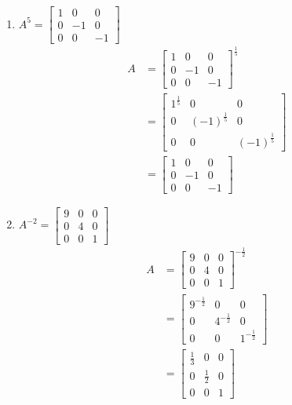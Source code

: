 \documentclass[
  letterpaper,
  DIV=11,
  numbers=noendperiod]{scrartcl}
\providecommand{\tightlist}{%
  \setlength{\itemsep}{0pt}\setlength{\parskip}{0pt}}\usepackage{longtable,booktabs,array}
\begin{document}
\begin{enumerate}
\def\labelenumi{\arabic{enumi})}
\tightlist
\item
  \(A^5=\begin{bmatrix}1 & 0 & 0 \\ 0 & -1 & 0 \\ 0 & 0 & -1\end{bmatrix}\)
  \begin{align*}
  A &= \begin{bmatrix}1 & 0 & 0 \\ 0 & -1 & 0 \\ 0 & 0 & -1\end{bmatrix}^{\frac{1}{5}} \\
  &= \begin{bmatrix}1^{\frac{1}{5}} & 0 & 0 \\ 0 & (-1)^{\frac{1}{5}} & 0 \\ 0 & 0 & (-1)^{\frac{1}{5}}\end{bmatrix} \\
  &= \begin{bmatrix}1 & 0 & 0 \\ 0 & -1 & 0 \\ 0 & 0 & -1\end{bmatrix}
  \end{align*}
\item
  \(A^{-2}=\begin{bmatrix}9 & 0 & 0 \\ 0 & 4 & 0 \\ 0 & 0 & 1\end{bmatrix}\)
  \begin{align*}
  A &= \begin{bmatrix}9 & 0 & 0 \\ 0 & 4 & 0 \\ 0 & 0 & 1\end{bmatrix}^{-\frac{1}{2}} \\
  &= \begin{bmatrix}9^{-\frac{1}{2}} & 0 & 0 \\ 0 & 4^{-\frac{1}{2}} & 0 \\ 0 & 0 & 1^{-\frac{1}{2}}\end{bmatrix} \\
  &= \begin{bmatrix}\frac{1}{3} & 0 & 0 \\ 0 & \frac{1}{2} & 0 \\ 0 & 0 & 1\end{bmatrix}
  \end{align*}
\end{enumerate}
\end{document}
